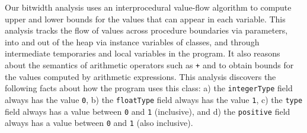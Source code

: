 \documentclass[oribibl]{llncs}
\begin{document}
Our bitwidth analysis uses an interprocedural
value-flow algorithm to compute upper and lower bounds for the
values that can appear in each variable. This analysis tracks
the flow of values across procedure boundaries via parameters,
into and out of the heap via instance variables of classes, and through
intermediate temporaries and local variables in the program.
It also reasons about the semantics of arithmetic operators such
as {\tt +} and {\tt *} to obtain bounds for the values computed
by arithmetic expressions. 
This analysis discovers the following facts about 
how the program uses this class: a) the {\tt integerType} 
field always has the value {\tt 0}, b) the {\tt floatType} 
field always has the value {\tt 1}, c) the {\tt type} 
field always has a value between {\tt 0} and {\tt 1} (inclusive),
and d) the {\tt positive} field always has a value between 
{\tt 0} and {\tt 1} (also inclusive).
\end{document}
